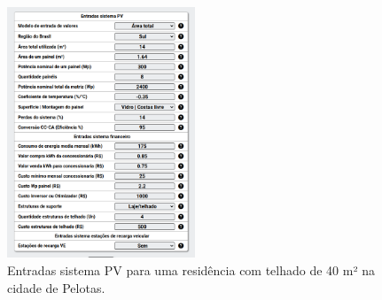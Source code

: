 \documentclass{beamer}
\begin{document}
\begin{frame}

\begin{figure}[H]
    \centering
    \includegraphics[width=0.5\textwidth]{./Figuras/casa_minha_1.png}
    \caption{Entradas sistema PV para uma residência com telhado de 40 m² na cidade de Pelotas.}
   \label{fig:casa_minha_1}
\end{figure}

\end{frame}
\end{document}
